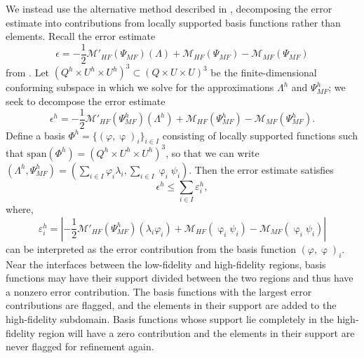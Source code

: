 \documentclass[review,sort&compress]{elsarticle}
\begin{document}
We instead use the alternative method described in \cite{vanOpstaletal15}, decomposing the error estimate into contributions from locally supported basis functions rather than elements. Recall the error estimate 
%
\begin{equation}
\epsilon=-\frac{1}{2}\mathcal{M}'_{HF}(\Psi_{MF})(\Lambda)+\mathcal M_{HF}(\Psi_{MF})-\mathcal M_{MF}(\Psi_{MF})
\end{equation}
%
from . Let $(Q^h\times U^h\times U^h)^3 \subset (Q\times U\times U)^3$ be the finite-dimensional conforming subspace in which we solve for the approximations $\Lambda^h$ and $\Psi_{MF}^h$; we seek to decompose the error estimate
%
\begin{equation}
\epsilon^h=-\frac{1}{2}\mathcal{M}'_{HF}(\Psi_{MF}^h)(\Lambda^h)+\mathcal M_{HF}(\Psi_{MF}^h)-\mathcal M_{MF}(\Psi_{MF}^h).
\end{equation}
%
Define a basis $\Phi^h=\{(\varphi,\upvarphi)_i\}_{i\in I}$ consisting of locally supported functions such that $\textrm{span}(\Phi^h)=(Q^h\times U^h\times U^h)^3$, so that we can write $(\Lambda^h,\Psi_{MF}^h)=(\sum\limits_{i\in I}\varphi_i\lambda_i,\sum\limits_{i\in I}\upvarphi_i \psi_i)$. Then the error estimate satisfies
%
\begin{equation}
\epsilon^h \leq \sum_{i\in I} \varepsilon^h_i,
\end{equation}
%
where,
%
\begin{equation}\label{eq:basisblame}
\varepsilon^h_i = \left| -\frac{1}{2}\mathcal{M}'_{HF}(\Psi_{MF}^h)(\lambda_i\varphi_i)+\mathcal M_{HF}(\upvarphi_i \psi_i)-\mathcal M_{MF}(\upvarphi_i \psi_i) \right|
\end{equation}
%
can be interpreted as the error contribution from the basis function $(\varphi,\upvarphi)_i$. Near the interfaces between the low-fidelity and high-fidelity regions, basis functions may have their support divided between the two regions and thus have a nonzero error contribution. The basis functions with the largest error contributions are flagged, and the elements in their support are added to the high-fidelity subdomain. Basis functions whose support lie completely in the high-fidelity region will have a zero contribution and the elements in their support are never flagged for refinement again. 
\end{document}
